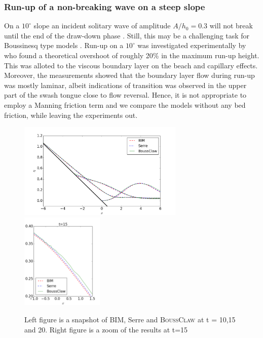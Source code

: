 \documentclass[review]{elsarticle}
\newcommand{\BoussClaw}{\textsc{BoussClaw} }
\begin{document}
\subsubsection{Run-up of a non-breaking wave on a steep slope}
\label{sec:10degrunup}
On a $10^\circ$ slope an incident solitary wave of amplitude $A/h_0=0.3$ will not break until the end of the draw-down phase \citep{Grilli:1997}.
Still, this may be a challenging task for Boussinesq type models \citep{Lovholt:2013a}. Run-up on a $10^\circ$ was investigated experimentally
by \citet{Pedersen:2013} who found a theoretical overshoot of roughly 20\% in the maximum run-up height. This was alloted to the viscous boundary layer on the beach and capillary effects. Moreover, the measurements showed that the boundary layer flow during run-up was mostly laminar, albeit indications of transition was observed in the upper part of the swash tongue close to flow reversal. Hence, it is not appropriate to employ a Manning friction term and we compare the models without any bed friction, while leaving the experiments out. 

\begin{figure}[!htb]
\centering
\includegraphics[height=4.6cm]{_fig/bim_serre_boussclaw_slope10}
\includegraphics[height=4.6cm]{_fig/bim_serre_boussclaw_slope10_zoom}
\caption{Left figure is a snapshot of BIM, Serre and \BoussClaw at
	t = 10,15 and 20. Right figure is a zoom of the results at t=15}
\label{fig:bim_serre_boussclaw_slope10}
\end{figure}
\end{document}
